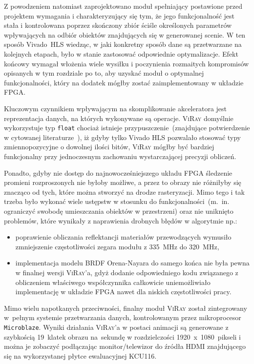 Z powodzeniem natomiast zaprojektowano moduł spełniający postawione przed projektem wymagania i charakteryzujący się tym, że jego funkcjonalność jest stała i kontrolowana poprzez skończony zbiór ściśle określonych parametrów wpływających na odbiór obiektów znajdujących się w generowanej scenie. W ten sposób Vivado~HLS wiedząc, w jaki konkretny sposób dane są przetwarzane na kolejnych etapach, było w stanie zastosować odpowiednie optymalizacje. Efekt końcowy wymagał włożenia wiele wysiłku i poczynienia rozmaitych kompromisów opisanych w tym rozdziale po to, aby uzyskać moduł o optymalnej funkcjonalności, który na dodatek mógłby zostać zaimplementowany w układzie FPGA.

Kluczowym czynnikiem wpływającym na skomplikowanie akceleratora jest reprezentacja danych, na których wykonywane są operacje. \textsc{ViRay} domyślnie wykorzystuje typ \texttt{float} chociaż istnieje przypuszczenie~(znajdujące potwierdzenie w cytowanej literaturze~\cite{RPU}), iż gdyby tylko Vivado HLS pozwalało stosować typy zmiennopozycyjne o dowolnej ilości bitów, \textsc{ViRay} mógłby być bardziej funkcjonalny przy jednoczesnym zachowaniu wystarczającej precyzji obliczeń.

Ponadto, gdyby nie dostęp do najnowocześniejszego układu FPGA śledzenie promieni rozproszonych nie byłoby możliwe, a przez to obrazy nie różniłyby się znacząco od tych, które można stworzyć na drodze rasteryzacji. Mimo tego i tak trzeba było wykonać wiele ustępstw w stosunku do funkcjonalności~(m.~in. ograniczyć swobodę umieszczania obiektów w przestrzeni) oraz nie uniknięto problemów, które wynikały z naprawienia drobnych błędów w algorytmie np.:
\begin{itemize}
\item poprawienie obliczania reflektancji materiałów przewodzących wymusiło zmniejszenie częstotliwości zegara modułu z 335~MHz do 320~MHz,
\item implementacja modelu BRDF Orena-Nayara do samego końca nie była pewna w finalnej wersji \textsc{ViRay}'a, gdyż dodanie odpowiedniego kodu związanego z obliczeniem właściwego współczynnika całkowicie uniemożliwiało implementację w układzie FPGA nawet dla niskich częstotliwości pracy.
\end{itemize}

Mimo wielu napotkanych przeciwności, finalny moduł \textsc{ViRay} został zintegrowany w~pełnym systemie przetwarzania danych, kontrolowanym przez mikroprocesor \texttt{Microblaze}. Wyniki działania \textsc{ViRay}'a w postaci animacji są generowane z szybkością 19~klatek obrazu na~sekundę w rozdzielczości 1920~x~1080~pikseli i można je zobaczyć podłączając monitor/telewizor do źródła HDMI znajdującego się na wykorzystanej płytce ewaluacyjnej KCU116.


